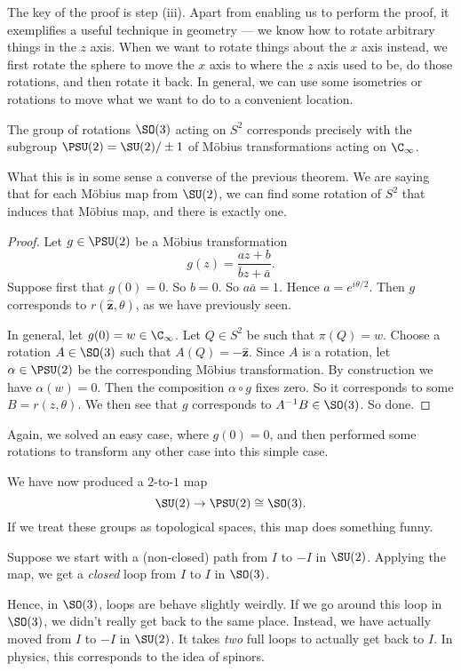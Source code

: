 \documentclass[a4paper]{article}
\begin{document}
The key of the proof is step (iii). Apart from enabling us to perform the proof, it exemplifies a useful technique in geometry --- we know how to rotate arbitrary things in the $z$ axis. When we want to rotate things about the $x$ axis instead, we first rotate the sphere to move the $x$ axis to where the $z$ axis used to be, do those rotations, and then rotate it back. In general, we can use some isometries or rotations to move what we want to do to a convenient location.

\begin{thm}
  The group of rotations $\SO(3)$ acting on $S^2$ corresponds precisely with the subgroup $\PSU(2) = \SU(2)/ \pm 1$ of M\"obius transformations acting on $\C_\infty$.
\end{thm}
What this is in some sense a converse of the previous theorem. We are saying that for each M\"obius map from $\SU(2)$, we can find some rotation of $S^2$ that induces that M\"obius map, and there is exactly one.

\begin{proof}
  Let $g \in \PSU(2)$ be a M\"obius transformation
  \[
    g(z) = \frac{az + b}{\bar{b} z + \bar{a}}.
  \]
  Suppose first that $g(0) = 0$. So $b = 0$. So $a\bar{a} = 1$. Hence $a = e^{i\theta/2}$. Then $g$ corresponds to $r(\hat{\mathbf{z}}, \theta)$, as we have previously seen.

  In general, let $g(0) = w \in \C_\infty$. Let $Q \in S^2$ be such that $\pi(Q) = w$. Choose a rotation $A \in \SO(3)$ such that $A(Q) = -\hat{\mathbf{z}}$. Since $A$ is a rotation, let $\alpha \in \PSU(2)$ be the corresponding M\"obius transformation. By construction we have $\alpha(w) = 0$. Then the composition $\alpha \circ g$ fixes zero. So it corresponds to some $B = r(z, \theta)$. We then see that $g$ corresponds to $A^{-1} B \in \SO(3)$. So done.
\end{proof}
Again, we solved an easy case, where $g(0) = 0$, and then performed some rotations to transform any other case into this simple case.

We have now produced a $2$-to-$1$ map
\[
  \SU(2) \to \PSU(2) \cong \SO(3).
\]
If we treat these groups as topological spaces, this map does something funny.

Suppose we start with a (non-closed) path from $I$ to $-I$ in $\SU(2)$. Applying the map, we get a \emph{closed} loop from $I$ to $I$ in $\SO(3)$.

Hence, in $\SO(3)$, loops are behave slightly weirdly. If we go around this loop in $\SO(3)$, we didn't really get back to the same place. Instead, we have actually moved from $I$ to $-I$ in $\SU(2)$. It takes \emph{two} full loops to actually get back to $I$. In physics, this corresponds to the idea of spinors.
\end{document}
